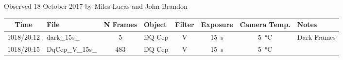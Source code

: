 \caption{Observed 18 October 2017 by Miles Lucas and John Brandon}
\begin{tabular}{clclcccl}
	\hline
	Time  & File            & N Frames & Object & Filter &     Exposure     &      Camera Temp.      & Notes \\ \hline\hline
	1018/20:12 & dark\_15s\_ &   5    & DQ Cep &   V    & \SI{15}{\second} & \SI{5}{\degreeCelsius} &  Dark Frames \\ 
	1018/20:15 & DqCep\_V\_15s\_ &   483    & DQ Cep &   V    & \SI{15}{\second} & \SI{5}{\degreeCelsius} &  \\ \hline
\end{tabular}